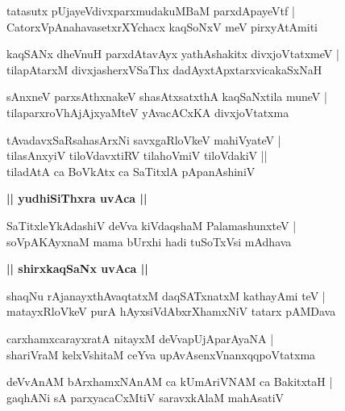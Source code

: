 \documentclass[twoside,12pt,openright]{book}
\newcounter{shloka}[chapter]
\def\uvaca#1{\centerline{{\large\textbf{#1}}}}
\begin{document}
\begin{shloka}%
tatasutx pUjayeVdivxparxmudakuMBaM parxdApayeVtf |\\
CatorxVpAnahavasetxrXYchacx kaqSoNxV meV pirxyAtAmiti	
\end{shloka}

\begin{shloka}%
kaqSANx dheVnuH parxdAtavAyx yathAshakitx divxjoVtatxmeV |\\
tilapAtarxM divxjasherxVSaThx dadAyxtApxtarxvicakaSxNaH
\end{shloka}

\begin{shloka}%
sAnxneV parxsAthxnakeV shasAtxsatxthA kaqSaNxtila muneV |\\
tilaparxroVhAjAjxyaMteV yAvacACxKA divxjoVtatxma
\end{shloka}

\begin{shloka}%
tAvadavxSaRsahasArxNi savxgaRloVkeV mahiVyateV |\\
tilasAnxyiV tiloVdavxtiRV tilahoVmiV tiloVdakiV ||\\
tiladAtA ca BoVkAtx ca SaTitxlA pApanAshiniV
\end{shloka}

\uvaca{|| yudhiSiThxra uvAca ||}

\begin{shloka}%
SaTitxleYkAdashiV deVva kiVdaqshaM PalamashunxteV |\\
soVpAKAyxnaM mama bUrxhi hadi tuSoTxVsi mAdhava 
\end{shloka}

\uvaca{|| shirxkaqSaNx uvAca ||}

\begin{shloka}%
shaqNu rAjanayxthAvaqtatxM daqSATxnatxM kathayAmi teV |\\
matayxRloVkeV purA hAyxsiVdAbxrXhamxNiV tatarx pAMDava 
\end{shloka}

\begin{shloka}%
carxhamxcarayxratA nitayxM deVvapUjAparAyaNA |\\
shariVraM kelxVshitaM ceYva upAvAsenxVnanxqqpoVtatxma
\end{shloka}

\begin{shloka}%
deVvAnAM bArxhamxNAnAM ca kUmAriVNAM ca BakitxtaH |\\
gaqhANi sA parxyacaCxMtiV saravxkAlaM mahAsatiV
\end{shloka}
\end{document}
